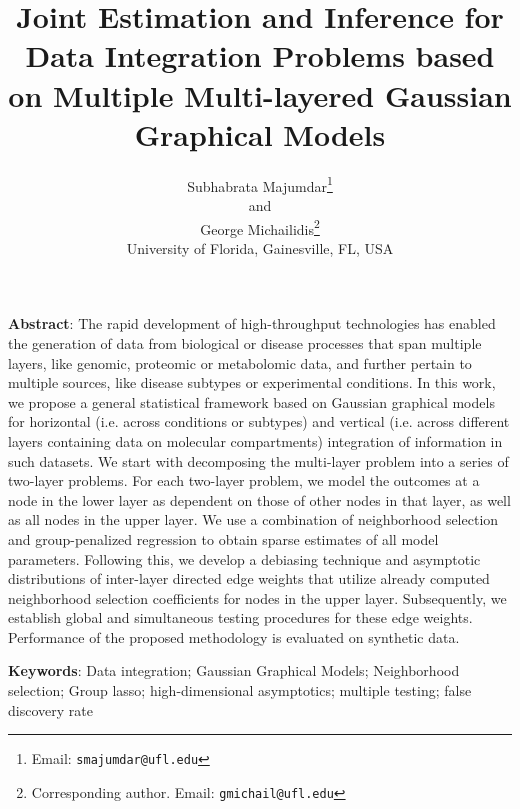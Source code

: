 \documentclass[11pt,letterpaper]{article}
\numberwithin{equation}{section}
\begin{document}
\newtheorem{Theorem}{theorem}[section]
\newtheorem{Lemma}[Theorem]{Lemma}
\newtheorem{Corollary}[Theorem]{Corollary}
\newtheorem{Proposition}[Theorem]{Proposition}
\newtheorem{Conjecture}[Theorem]{Conjecture}
\theoremstyle{definition} \newtheorem{Definition}[Theorem]{Definition}
\newtheorem{Example}{Example}[section]
\newtheorem{Algorithm}{Algorithm}
\newtheorem{Remark}{Remark}

\title{Joint Estimation and Inference for Data Integration Problems based on Multiple Multi-layered Gaussian Graphical Models}
\date{}
\author{
	Subhabrata Majumdar\thanks{Email: {\tt smajumdar@ufl.edu}}\\
	and\\
	George Michailidis\thanks{Corresponding author. Email: {\tt gmichail@ufl.edu}}\\
	University of Florida, Gainesville, FL, USA
}
\maketitle

\noindent\textbf{Abstract}: 
The rapid development of high-throughput technologies has enabled the generation of data from biological or disease processes that span multiple layers, like genomic, proteomic or metabolomic data, and further pertain to multiple sources, like disease subtypes or experimental conditions. In this work, we propose a general statistical framework based on Gaussian graphical models for horizontal (i.e. across conditions or subtypes) and vertical (i.e. across different layers containing data on molecular compartments) integration of information in such datasets. We start with decomposing the multi-layer problem into a series of two-layer problems. For each two-layer problem, we model the outcomes at a node in the lower layer as dependent on those of other nodes in that layer, as well as all nodes in the upper layer. We use a combination of neighborhood selection and group-penalized regression to obtain sparse estimates of all model parameters. Following this, we develop a debiasing technique and asymptotic distributions of inter-layer directed edge weights that utilize already computed neighborhood selection coefficients for nodes in the upper layer. Subsequently, we establish global and simultaneous testing procedures for these edge weights. Performance of the proposed methodology is evaluated on synthetic data.

\vspace{.5cm}
\noindent\textbf{Keywords}: Data integration; Gaussian Graphical Models; Neighborhood selection; Group lasso; high-dimensional asymptotics; multiple testing; false discovery rate
\end{document}
